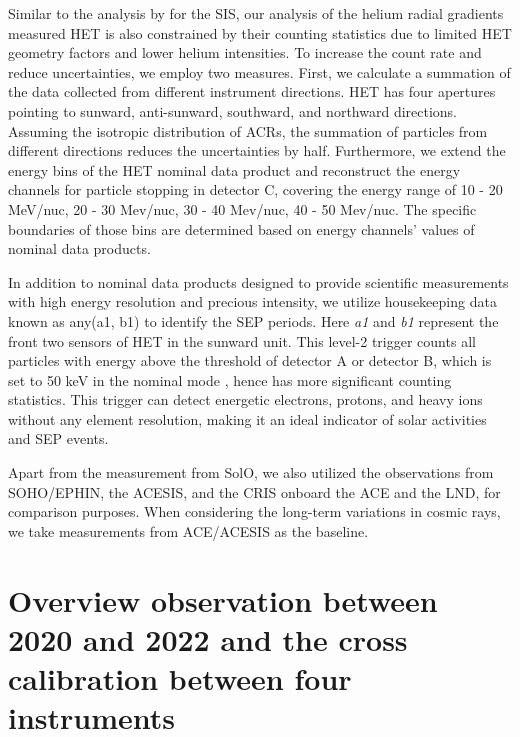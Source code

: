 Similar to the analysis by \citet{Mason-2021-SolOQuietTime} for the \ac{SIS}, our analysis of the helium radial gradients measured \ac{HET} is also constrained by their counting statistics due to limited \ac{HET} geometry factors and lower helium intensities. To increase the count rate and reduce uncertainties, we employ two measures. First, we calculate a summation of the data collected from different instrument directions. \ac{HET} has four apertures pointing to sunward, anti-sunward, southward, and northward directions. Assuming the isotropic distribution of \acp{ACR}, the summation of particles from different directions reduces the uncertainties by half. Furthermore, we extend the energy bins of the \ac{HET} nominal data product and reconstruct the energy channels for particle stopping in detector C, covering the energy range of 10 - 20 MeV/nuc, 20 - 30 Mev/nuc, 30 - 40 Mev/nuc, 40 - 50 Mev/nuc. The specific boundaries of those bins are determined based on energy channels' values of nominal data products.

In addition to nominal data products designed to provide scientific measurements with high energy resolution and precious intensity, we utilize housekeeping data known as any(a1, b1) to identify the \ac{SEP} periods. Here \textit{a1} and \textit{b1} represent the front two sensors of \ac{HET} in the sunward unit. This level-2 trigger counts all particles with energy above the threshold of detector A or detector B, which is set to 50 keV in the nominal mode \citep{Elftmann-2020-PhD}, hence has more significant counting statistics. This trigger can detect energetic electrons, protons, and heavy ions without any element resolution, making it an ideal indicator of solar activities and \ac{SEP} events. 


Apart from the measurement from \ac{SolO}, we also utilized the observations from \ac{SOHO}/\ac{EPHIN}, the \ac{ACESIS}, and the \ac{CRIS} onboard the \ac{ACE} and the \ac{LND}, for comparison purposes.  When considering the long-term variations in cosmic rays,  we take measurements from \ac{ACE}/\ac{ACESIS} as the baseline.


\section{Overview observation between 2020 and 2022 and the cross calibration between four instruments}


